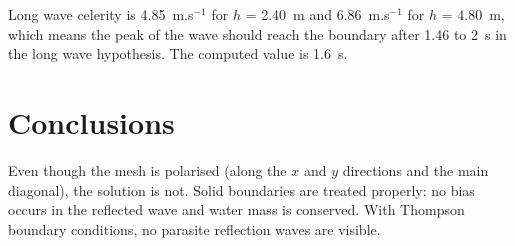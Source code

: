 Long wave celerity is 4.85~m.s$^{-1}$ for $h$ = 2.40~m and 6.86~m.s$^{-1}$ for
$h$ = 4.80~m,
which means the peak of the wave should reach the boundary after 1.46 to 2~s
in the long wave hypothesis.
The computed value is 1.6~s.

\section{Conclusions}

Even though the mesh is polarised (along the $x$ and $y$ directions and the main
diagonal), the solution is not.
Solid boundaries are treated properly: no bias occurs in the reflected wave and
water mass is conserved.
With Thompson boundary conditions, no parasite reflection waves are visible.
%
%
%
%
%
